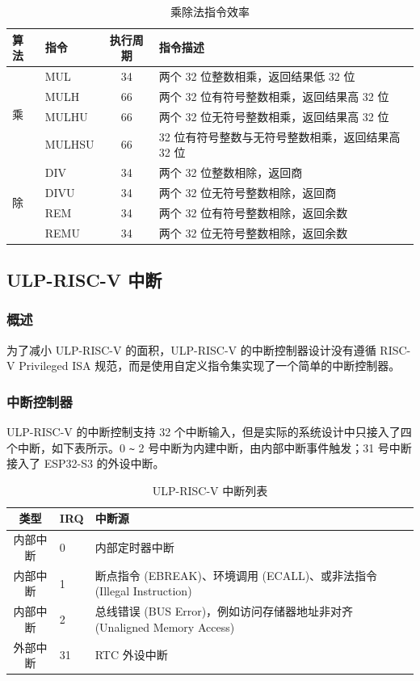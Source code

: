 \documentclass[main\_\_CN.tex]{subfiles}
\begin{document}
\clearpage
\begin{longtable}{ |p{1cm}|p{2cm}|c|p{8.5cm}|}
    \caption{乘除法指令效率}
    \label{tab:multi-and-div-instr}
    \\\hline
    \rowcolor{lightgray}
    算法  & 指令 & 执行周期 & 指令描述\\\hline
    \multirow{4}{*}{乘}    &  MUL  & 34 & 两个 32 位整数相乘，返回结果低 32 位 \\ \cline{2-4}
    & MULH & 66 & 两个 32 位有符号整数相乘，返回结果高 32 位 \\ \cline{2-4}
    & MULHU & 66 & 两个 32 位无符号整数相乘，返回结果高 32 位 \\ \cline{2-4}
    & MULHSU & 66 & 32 位有符号整数与无符号整数相乘，返回结果高 32 位\\
    \hline
    \multirow{4}{*}{除}   &  DIV  & 34 & 两个 32 位整数相除，返回商 \\ \cline{2-4}
    & DIVU & 34 & 两个 32 位无符号整数相除，返回商 \\ \cline{2-4}
    & REM & 34 & 两个 32 位有符号整数相除，返回余数 \\ \cline{2-4}
    & REMU & 34 & 两个 32 位无符号整数相除，返回余数 \\
    \hline
\end{longtable}

\subsection{ULP-RISC-V 中断}
\subsubsection{概述}
为了减小 ULP-RISC-V 的面积，ULP-RISC-V 的中断控制器设计没有遵循 RISC-V Privileged ISA 规范，而是使用自定义指令集实现了一个简单的中断控制器。

\subsubsection{中断控制器}
ULP-RISC-V 的中断控制支持 32 个中断输入，但是实际的系统设计中只接入了四个中断，如下表所示。0 \verb+~+ 2 号中断为内建中断，由内部中断事件触发；31 号中断接入了 ESP32-S3 的外设中断。

\begin{table}[H]
    \centering
    \begin{tabular}{ c l l }
    \textbf{类型} & \textbf{IRQ} & \textbf{中断源} \\ \hline
    内部中断 & 0 & 内部定时器中断 \\
    内部中断 & 1 & 断点指令 (EBREAK)、环境调用 (ECALL)、或非法指令 (Illegal Instruction)\\
    内部中断 & 2 & 总线错误 (BUS Error)，例如访问存储器地址非对齐 (Unaligned Memory Access)\\
    外部中断 & 31 & RTC 外设中断 \\
    \end{tabular}
    \caption{ULP-RISC-V 中断列表}
    \label{tab:PicoRV32-interrupt-list-1}
\end{table}
\end{document}
